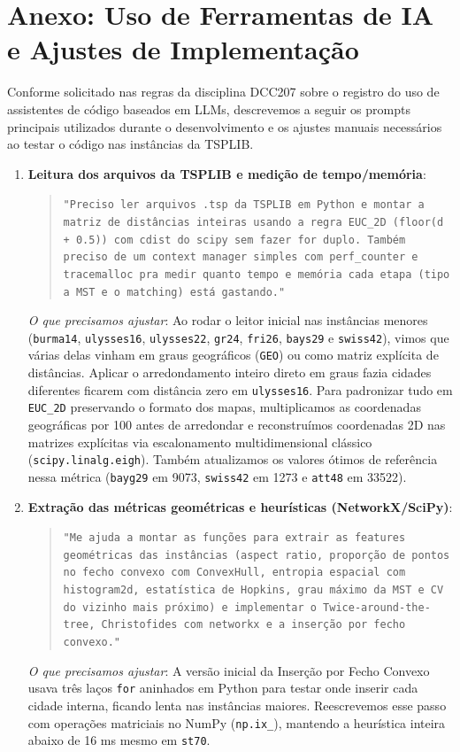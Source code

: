 \documentclass[12pt]{article}
\begin{document}
\enlargethispage{2\baselineskip}



\newpage
\appendix
\section{Anexo: Uso de Ferramentas de IA e Ajustes de Implementação}

Conforme solicitado nas regras da disciplina DCC207 sobre o registro do uso de assistentes de código baseados em LLMs, descrevemos a seguir os prompts principais utilizados durante o desenvolvimento e os ajustes manuais necessários ao testar o código nas instâncias da TSPLIB.

\begin{enumerate}
  \item \textbf{Leitura dos arquivos da TSPLIB e medição de tempo/memória}:
  \begin{quote}
  \small\texttt{"Preciso ler arquivos .tsp da TSPLIB em Python e montar a matriz de distâncias inteiras usando a regra EUC\_2D (floor(d + 0.5)) com cdist do scipy sem fazer for duplo. Também preciso de um context manager simples com perf\_counter e tracemalloc pra medir quanto tempo e memória cada etapa (tipo a MST e o matching) está gastando."}
  \end{quote}
  \textit{O que precisamos ajustar}: Ao rodar o leitor inicial nas instâncias menores (\texttt{burma14}, \texttt{ulysses16}, \texttt{ulysses22}, \texttt{gr24}, \texttt{fri26}, \texttt{bays29} e \texttt{swiss42}), vimos que várias delas vinham em graus geográficos (\texttt{GEO}) ou como matriz explícita de distâncias. Aplicar o arredondamento inteiro direto em graus fazia cidades diferentes ficarem com distância zero em \texttt{ulysses16}. Para padronizar tudo em \texttt{EUC\_2D} preservando o formato dos mapas, multiplicamos as coordenadas geográficas por 100 antes de arredondar e reconstruímos coordenadas 2D nas matrizes explícitas via escalonamento multidimensional clássico (\texttt{scipy.linalg.eigh}). Também atualizamos os valores ótimos de referência nessa métrica (\texttt{bayg29} em 9073, \texttt{swiss42} em 1273 e \texttt{att48} em 33522).

  \item \textbf{Extração das métricas geométricas e heurísticas (NetworkX/SciPy)}:
  \begin{quote}
  \small\texttt{"Me ajuda a montar as funções para extrair as features geométricas das instâncias (aspect ratio, proporção de pontos no fecho convexo com ConvexHull, entropia espacial com histogram2d, estatística de Hopkins, grau máximo da MST e CV do vizinho mais próximo) e implementar o Twice-around-the-tree, Christofides com networkx e a inserção por fecho convexo."}
  \end{quote}
  \textit{O que precisamos ajustar}: A versão inicial da Inserção por Fecho Convexo usava três laços \texttt{for} aninhados em Python para testar onde inserir cada cidade interna, ficando lenta nas instâncias maiores. Reescrevemos esse passo com operações matriciais no NumPy (\texttt{np.ix\_}), mantendo a heurística inteira abaixo de 16 ms mesmo em \texttt{st70}.


\end{enumerate}
\end{document}
